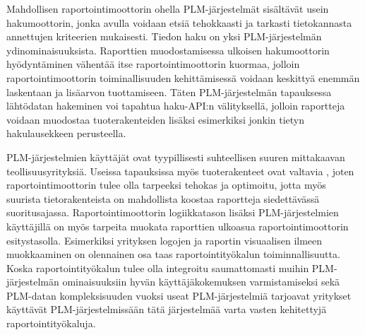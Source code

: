 Mahdollisen raportointimoottorin ohella PLM-järjestelmät sisältävät usein hakumoottorin, jonka avulla voidaan etsiä tehokkaasti ja tarkasti tietokannasta annettujen kriteerien mukaisesti. Tiedon haku on yksi PLM-järjestelmän ydinominaisuuksista. \cite{enriquez_approach_2019} Raporttien muodostamisessa ulkoisen hakumoottorin hyödyntäminen vähentää itse raportointimoottorin kuormaa, jolloin raportointimoottorin toiminallisuuden kehittämisessä voidaan keskittyä enemmän laskentaan ja lisäarvon tuottamiseen. Täten PLM-järjestelmän tapauksessa lähtödatan hakeminen voi tapahtua haku-API:n välityksellä, jolloin raportteja voidaan muodostaa tuoterakenteiden lisäksi esimerkiksi jonkin tietyn hakulausekkeen perusteella.

PLM-järjestelmien käyttäjät ovat tyypillisesti suhteellisen suuren mittakaavan teollisuusyrityksiä. Useissa tapauksissa myös tuoterakenteet ovat valtavia \cite{rohleder_requirements_2014}, joten raportointimoottorin tulee olla tarpeeksi tehokas ja optimoitu, jotta myös suurista tietorakenteista on mahdollista koostaa raportteja siedettävässä suoritusajassa. Raportointimoottorin logiikkatason lisäksi PLM-järjestelmien käyttäjillä on myös tarpeita muokata raporttien ulkoasua raportointimoottorin esitystasolla. Esimerkiksi yrityksen logojen ja raportin visuaalisen ilmeen muokkaaminen on olennainen osa taas raportointityökalun toiminnallisuutta. Koska raportointityökalun tulee olla integroitu saumattomasti muihin PLM-järjestelmän ominaisuuksiin hyvän käyttäjäkokemuksen varmistamiseksi sekä PLM-datan kompleksisuuden vuoksi useat PLM-järjestelmiä tarjoavat yritykset käyttävät PLM-järjestelmissään tätä järjestelmää varta vasten kehitettyjä raportointityökaluja.